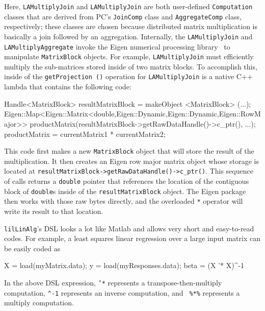 \noindent Here, \texttt{LAMultiplyJoin} and \texttt{LAMultiplyJoin} are 
both user-defined \texttt{Computation} classes that are
derived from PC's \texttt{JoinComp} class and \texttt{AggregateComp} class, respectively; these classes are chosen 
because distributed matrix multiplication
is basically a join followed by an aggregation.
Internally, the \texttt{LAMultiplyJoin}
and \texttt{LAMultiplyAggregate} invoke the Eigen numerical processing
library~\cite{eigen} to manipulate \texttt{MatrixBlock} objects.
For example, \texttt{LAMultiplyJoin} must efficiently multiply the sub-matrices stored inside of two matrix blocks.
To accomplish this, inside of the \texttt{getProjection ()} operation for
\texttt{LAMultiplyJoin} is a native C++ lambda that contains the following code:

\begin{code}
Handle<MatrixBlock> resultMatrixBlock = makeObject <MatrixBlock> (...);
Eigen::Map<Eigen::Matrix<double,Eigen::Dynamic,Eigen::Dynamic,Eigen::RowMajor>> 
   productMatrix(resultMatrixBlock->getRawDataHandle()->c_ptr(), ...);
productMatrix = currentMatrix1 * currentMatrix2;
\end{code}

\noindent This code first makes a new \texttt{MatrixBlock} object that will store the result of the multiplication.
 It then creates an 
Eigen row major matrix object whose storage is located at 
\texttt{resultMatrixBlock->}\-\texttt{getRaw}\-\texttt{DataHandle()->}\-\texttt{c\_ptr()}.  This
sequence of calls
returns a \texttt{double} pointer that references the location of the contiguous block of \texttt{double}s inside of
the \texttt{resultMatrixBlock} object.
The Eigen package then works with those raw bytes directly,
and the overloaded \texttt{*} operator will write its result to that location.

\texttt{lilLinAlg}'s DSL looks a lot like Matlab and allows very short and easy-to-read codes.
For example, 
a least squares linear regression over a large input matrix can be easily coded as

\begin{code}
X = load(myMatrix.data); 
y = load(myResponses.data); 
beta = (X '* X)^-1 %
\end{code}

\noindent In the above DSL expression, \texttt{'*} represents a transpose-then-multiply computation,
\texttt{\^{}-1} represents an inverse computation, and \texttt{ \%*\%}
represents a multiply computation. 

